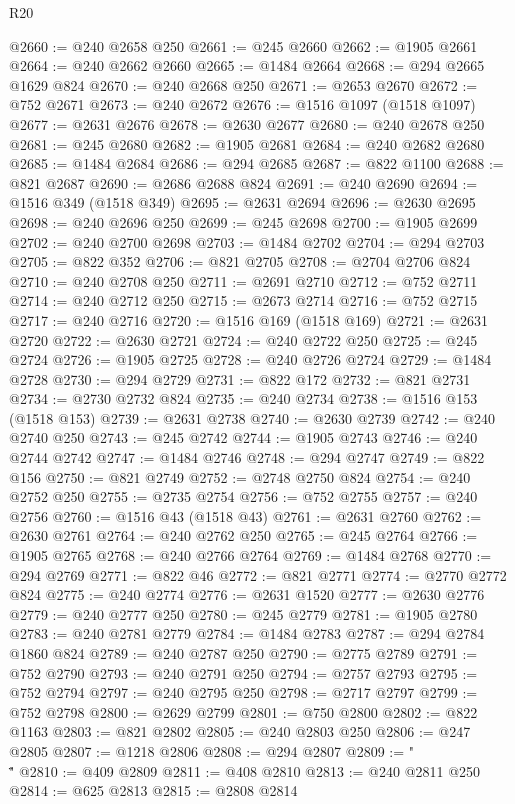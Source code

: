 \begin{lexlean}{R20}
\begin{coremodule}
{@2660 := @240 @2658 @250
@2661 := @245 @2660
@2662 := @1905 @2661
@2664 := @240 @2662 @2660
@2665 := @1484 @2664
@2668 := @294 @2665 @1629 @824
@2670 := @240 @2668 @250
@2671 := @2653 @2670
@2672 := @752 @2671
@2673 := @240 @2672
@2676 := @1516 @1097 (@1518 @1097)
@2677 := @2631 @2676
@2678 := @2630 @2677
@2680 := @240 @2678 @250
@2681 := @245 @2680
@2682 := @1905 @2681
@2684 := @240 @2682 @2680
@2685 := @1484 @2684
@2686 := @294 @2685
@2687 := @822 @1100
@2688 := @821 @2687
@2690 := @2686 @2688 @824
@2691 := @240 @2690
@2694 := @1516 @349 (@1518 @349)
@2695 := @2631 @2694
@2696 := @2630 @2695
@2698 := @240 @2696 @250
@2699 := @245 @2698
@2700 := @1905 @2699
@2702 := @240 @2700 @2698
@2703 := @1484 @2702
@2704 := @294 @2703
@2705 := @822 @352
@2706 := @821 @2705
@2708 := @2704 @2706 @824
@2710 := @240 @2708 @250
@2711 := @2691 @2710
@2712 := @752 @2711
@2714 := @240 @2712 @250
@2715 := @2673 @2714
@2716 := @752 @2715
@2717 := @240 @2716
@2720 := @1516 @169 (@1518 @169)
@2721 := @2631 @2720
@2722 := @2630 @2721
@2724 := @240 @2722 @250
@2725 := @245 @2724
@2726 := @1905 @2725
@2728 := @240 @2726 @2724
@2729 := @1484 @2728
@2730 := @294 @2729
@2731 := @822 @172
@2732 := @821 @2731
@2734 := @2730 @2732 @824
@2735 := @240 @2734
@2738 := @1516 @153 (@1518 @153)
@2739 := @2631 @2738
@2740 := @2630 @2739
@2742 := @240 @2740 @250
@2743 := @245 @2742
@2744 := @1905 @2743
@2746 := @240 @2744 @2742
@2747 := @1484 @2746
@2748 := @294 @2747
@2749 := @822 @156
@2750 := @821 @2749
@2752 := @2748 @2750 @824
@2754 := @240 @2752 @250
@2755 := @2735 @2754
@2756 := @752 @2755
@2757 := @240 @2756
@2760 := @1516 @43 (@1518 @43)
@2761 := @2631 @2760
@2762 := @2630 @2761
@2764 := @240 @2762 @250
@2765 := @245 @2764
@2766 := @1905 @2765
@2768 := @240 @2766 @2764
@2769 := @1484 @2768
@2770 := @294 @2769
@2771 := @822 @46
@2772 := @821 @2771
@2774 := @2770 @2772 @824
@2775 := @240 @2774
@2776 := @2631 @1520
@2777 := @2630 @2776
@2779 := @240 @2777 @250
@2780 := @245 @2779
@2781 := @1905 @2780
@2783 := @240 @2781 @2779
@2784 := @1484 @2783
@2787 := @294 @2784 @1860 @824
@2789 := @240 @2787 @250
@2790 := @2775 @2789
@2791 := @752 @2790
@2793 := @240 @2791 @250
@2794 := @2757 @2793
@2795 := @752 @2794
@2797 := @240 @2795 @250
@2798 := @2717 @2797
@2799 := @752 @2798
@2800 := @2629 @2799
@2801 := @750 @2800
@2802 := @822 @1163
@2803 := @821 @2802
@2805 := @240 @2803 @250
@2806 := @247 @2805
@2807 := @1218 @2806
@2808 := @294 @2807
@2809 := "\\\""
@2810 := @409 @2809
@2811 := @408 @2810
@2813 := @240 @2811 @250
@2814 := @625 @2813
@2815 := @2808 @2814
}
\end{coremodule}
\end{lexlean}
